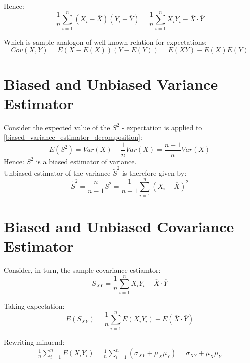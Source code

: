 \documentclass[12pt]{article}
\begin{document}
Hence:
\begin{equation}
\frac{1}{n} \sum_{i=1}^{n} (X_i - \overline{X}) (Y_i - \overline{Y}) = 
\frac{1}{n} \sum_{i=1}^{n} X_i Y_i - \overline{X} \cdot \overline{Y}
\end{equation}

Which is sample analogon of well-known relation for expectations:
\begin{equation*}
Cov(X, Y) = E(X-E(X))(Y-E(Y)) = E(XY) - E(X) E(Y)
\end{equation*}


\section{Biased and Unbiased Variance Estimator}
Consider the expected value of the $S^2$ - expectation is applied to 
\eqref{biased_variance_estimator_decomposition}:
\begin{equation*}
E(S^2) = Var(X) - \frac{1}{n} Var(X) = \frac{n-1}{n} Var(X)
\end{equation*}
Hence: $S^2$ is a biased estimator of variance.\\
\indent Unbiased estimator of the variance $\tilde{S}^2$ is therefore given by:
\begin{equation*}
\tilde{S}^2 = \frac{n}{n-1} S^2 = 
\frac{1}{n-1} \sum_{i=1}^{n} (X_i - \overline{X})^2
\end{equation*}

\section{Biased and Unbiased Covariance Estimator}
Consider, in turn, the sample covariance estiamtor:
\begin{equation*}
S_{XY} = \frac{1}{n} \sum_{i=1}^{n}X_i Y_i - \overline{X} \cdot \overline{Y}
\end{equation*}

Taking expectation:
\begin{equation*}
E(S_{XY}) = \frac{1}{n} \sum_{i=1}^{n} E(X_i Y_i) - 
E(\overline{X} \cdot \overline{Y}) 
\end{equation*}

Rewriting minuend:
\begin{eqnarray*}
\frac{1}{n} \sum_{i=1}^{n} E(X_i Y_i) = 
\frac{1}{n} \sum_{i=1}^{n} \left(
\sigma_{XY} + \mu_X \mu_Y
\right) = \sigma_{XY} + \mu_X \mu_Y
\end{eqnarray*}
\end{document}
